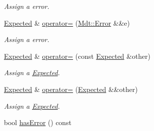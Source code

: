 \begin{DoxyCompactItemize}
\begin{DoxyCompactList}\small\item\em Assign a error. \end{DoxyCompactList}\item 
\hyperlink{class_mdt_1_1_expected}{Expected} \& \hyperlink{class_mdt_1_1_expected_a97c105de76860ec6fa9ce7926d6bc6a4}{operator=} (\hyperlink{class_mdt_1_1_error}{Mdt\+::\+Error} \&\&e)\hypertarget{class_mdt_1_1_expected_a97c105de76860ec6fa9ce7926d6bc6a4}{}\label{class_mdt_1_1_expected_a97c105de76860ec6fa9ce7926d6bc6a4}

\begin{DoxyCompactList}\small\item\em Assign a error. \end{DoxyCompactList}\item 
\hyperlink{class_mdt_1_1_expected}{Expected} \& \hyperlink{class_mdt_1_1_expected_a95886cd2913a38e147186ed3d9e72a7c}{operator=} (const \hyperlink{class_mdt_1_1_expected}{Expected} \&other)\hypertarget{class_mdt_1_1_expected_a95886cd2913a38e147186ed3d9e72a7c}{}\label{class_mdt_1_1_expected_a95886cd2913a38e147186ed3d9e72a7c}

\begin{DoxyCompactList}\small\item\em Assign a \hyperlink{class_mdt_1_1_expected}{Expected}. \end{DoxyCompactList}\item 
\hyperlink{class_mdt_1_1_expected}{Expected} \& \hyperlink{class_mdt_1_1_expected_a2c8f56f9a45c4b9b70ae2c7eadb2b96d}{operator=} (\hyperlink{class_mdt_1_1_expected}{Expected} \&\&other)\hypertarget{class_mdt_1_1_expected_a2c8f56f9a45c4b9b70ae2c7eadb2b96d}{}\label{class_mdt_1_1_expected_a2c8f56f9a45c4b9b70ae2c7eadb2b96d}

\begin{DoxyCompactList}\small\item\em Assign a \hyperlink{class_mdt_1_1_expected}{Expected}. \end{DoxyCompactList}\item 
bool \hyperlink{class_mdt_1_1_expected_acddb65fce2a9823e36663cbca8eaadc5}{has\+Error} () const \hypertarget{class_mdt_1_1_expected_acddb65fce2a9823e36663cbca8eaadc5}{}\label{class_mdt_1_1_expected_acddb65fce2a9823e36663cbca8eaadc5}


\end{DoxyCompactItemize}
